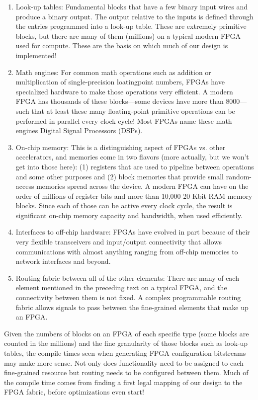 \begin{enumerate}
	\item Look-up tables: Fundamental blocks that have a few binary input wires and produce a binary output. The output relative to the inputs is defined through the entries programmed into a look-up table. These are extremely primitive blocks, but there are many of them (millions) on a typical modern FPGA used for compute. These are the basis on which much of our design is implemented!
	\item Math engines: For common math operations such as addition or multiplication of single-precision loatingpoint numbers, FPGAs have specialized hardware to make those operations very efficient. A modern FPGA has thousands of these blocks—some devices have more than 8000—such that at least these many floating-point primitive operations can be performed in parallel every clock cycle! Most FPGAs name these math engines Digital Signal Processors (DSPs).
	\item On-chip memory: This is a distinguishing aspect of FPGAs vs. other accelerators, and memories come in two flavors (more actually, but we won’t get into 	those here): (1) registers that are used to pipeline 	between operations and some other purposes and (2) block memories that provide small random-access memories spread across the device. A modern FPGA can have on the order of millions of register bits and more than 10,000 20 Kbit RAM memory blocks. Since each of those can be active every clock cycle, the result is significant on-chip memory capacity and bandwidth, when used efficiently.
	\item Interfaces to off-chip hardware: FPGAs have evolved in part because of their very flexible transceivers and input/output connectivity that allows communications with almost anything ranging from off-chip memories to network interfaces and beyond.
	\item Routing fabric between all of the other elements: There are many of each element mentioned in the preceding text on a typical FPGA, and the connectivity between them is not fixed. A complex programmable routing fabric allows signals to pass between the fine-grained elements that make up an FPGA.
\end{enumerate}

Given the numbers of blocks on an FPGA of each specific type (some blocks are counted in the millions) and the fine granularity of those blocks such as look-up tables, the compile times seen when generating FPGA configuration bitstreams may make more sense. Not only does functionality need to be assigned to each fine-grained resource but routing needs to be configured between them. Much of the compile time comes from finding a first legal mapping of our design to the FPGA fabric, before optimizations even start!\par

